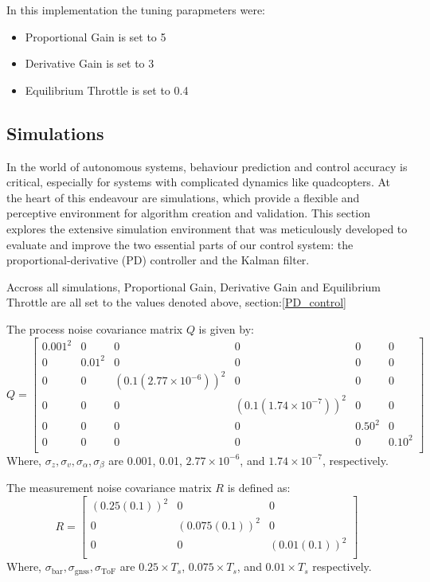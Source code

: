 \documentclass{report}
\begin{document}
In this implementation the tuning parapmeters were: 
\begin{itemize}
  \item Proportional Gain is set to 5 
  \item Derivative Gain is set to 3 
  \item Equilibrium Throttle is set to 0.4
\end{itemize}

\subsection{Simulations}\label{PD_simulations} In the world of autonomous
systems, behaviour prediction and control accuracy is critical, especially for
systems with complicated dynamics like quadcopters. At the heart of this
endeavour are simulations, which provide a flexible and perceptive environment
for algorithm creation and validation. This section explores the extensive
simulation environment that was meticulously developed to evaluate and improve
the two essential parts of our control system: the proportional-derivative (PD)
controller and the Kalman filter.

Accross all simulations, Proportional Gain, Derivative Gain and Equilibrium
Throttle are all set to the values denoted above, section:\ref{PD_control}

The process noise covariance matrix \( Q \) is given by:
\begin{equation}
Q = \begin{bmatrix}
0.001^2 & 0 & 0 & 0 & 0 & 0 \\
0 & 0.01^2 & 0 & 0 & 0 & 0 \\
0 & 0 & (0.1 (2.77 \times 10^{-6}))^2 & 0 & 0 & 0 \\
0 & 0 & 0 & (0.1 (1.74 \times 10^{-7}))^2 & 0 & 0 \\
0 & 0 & 0 & 0 & 0.50^2 & 0 \\
0 & 0 & 0 & 0 & 0 & 0.10^2 \\
\end{bmatrix}
\end{equation}
Where, \( \sigma_z, \sigma_v, \sigma_\alpha, \sigma_\beta \) are 0.001, 0.01, \(
2.77 \times 10^{-6} \), and \( 1.74 \times 10^{-7} \), respectively.
\bigskip

The measurement noise covariance matrix \( R \) is defined as:
\begin{equation}
R = \begin{bmatrix}
(0.25(0.1))^2 & 0 & 0 \\
0 & (0.075(0.1))^2 & 0 \\
0 & 0 & (0.01(0.1))^2 \\
\end{bmatrix}
\end{equation}
Where, \( \sigma_{\text{bar}}, \sigma_{\text{gnss}}, \sigma_{\text{ToF}} \) are
\( 0.25 \times T_s \), \( 0.075 \times T_s \), and \( 0.01 \times T_s \)
respectively.
\end{document}
